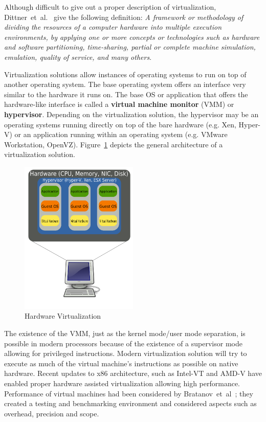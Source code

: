 Although difficult to give out a proper description of virtualization, Dittner~et~al.~\cite{best-damn-virt} give the following definition: \textit{A framework
or methodology of dividing the resources of a computer hardware into multiple
execution environments, by applying one or more concepts or technologies such
as hardware and software partitioning, time-sharing, partial or complete
machine simulation, emulation, quality of service, and many others}.

Virtualization solutions allow instances of operating systems to run on top of
another operating system. The base operating system offers an interface very
similar to the hardware it runs on. The base OS or application that offers the
hardware-like interface is called a \textbf{virtual machine monitor} (VMM) or
\textbf{hypervisor}. Depending on the virtualization solution, the hypervisor
may be an operating systems running directly on top of the bare hardware (e.g.
Xen, Hyper-V) or an application running within an operating system (e.g.
VMware Workstation, OpenVZ).
Figure~\ref{fig:virt-infra:hardware-virtualization} depicts the general
architecture of a virtualization solution.

\begin{figure}
  \centering
  \includegraphics[width=0.5\textwidth]{src/img/virt-infra/hardware-virtualization}
  \caption{Hardware Virtualization}
  \label{fig:virt-infra:hardware-virtualization}
\end{figure}

The existence of the VMM, just as the kernel mode/user mode separation, is
possible in modern processors because of the existence of a supervisor mode
allowing for privileged instructions. Modern virtualization solution will try
to execute as much of the virtual machine's instructions as possible on native
hardware. Recent updates to x86 architecture, such as Intel-VT and AMD-V have
enabled proper hardware assisted virtualization allowing high performance.
Performance of virtual machines had been considered by
Bratanov~et~al~\cite{virt-analysis}; they created a testing and benchmarking
environment and considered aspects such as overhead, precision and scope.

